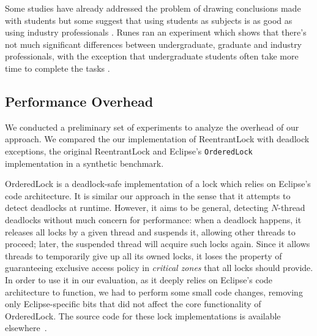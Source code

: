Some studies have already addressed the problem of drawing conclusions made with students but some suggest that using students as subjects is as good as using industry professionals \cite{staron}. Runes ran an experiment which shows that there's not much significant differences between undergraduate, graduate and industry professionals, with the exception that undergraduate students often take more time to complete the tasks \cite{runes}.

\subsection{Performance Overhead}\label{sec:perf}

We conducted a preliminary set of experiments to analyze the overhead of our approach.
We compared the our implementation of ReentrantLock with deadlock exceptions, the original ReentrantLock and Eclipse's {\tt OrderedLock}~\cite{orderedlock} implementation in a synthetic benchmark.

OrderedLock is a deadlock-safe implementation of a lock which relies on Eclipse's code architecture.
It is similar our approach in the sense that it attempts to detect deadlocks at runtime. However, it aims to be general, detecting $N$-thread deadlocks without much concern for performance: when a deadlock happens, it releases all locks by a given thread and suspends it, allowing other threads to proceed;
later, the suspended thread will acquire such locks again.
Since it allows threads to temporarily give up all its owned locks, it loses the property of guaranteeing exclusive access policy in \emph{critical zones} that all locks should provide.
In order to use it in our evaluation, as it deeply relies on Eclipse's code architecture to function, we had to perform some small code changes, removing only Eclipse-specific bits that did not affect the core functionality of OrderedLock.
The source code for these lock implementations is available elsewhere~\cite{repo}.

